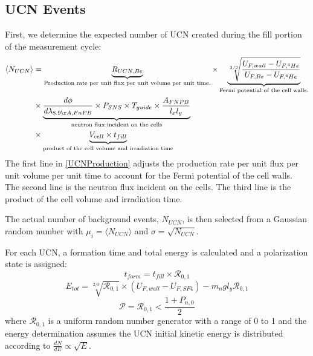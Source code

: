 \subsection{UCN Events}
First, we determine the expected number of UCN created during the fill portion of the measurement cycle:
\begin{align}\label{UCNProduction}
\begin{split}
    \langle N_{UCN} \rangle  & = \underbrace{ R_{UCN, Be} }_{\text{Production rate per unit flux per unit volume per unit time.} } \times  \underbrace{ \sqrt[3/2]{ \frac{ U_{F,wall}  - U_{F,^4He} }{ U_{F,Be} - U_{F,^4He} } } }_{\text{Fermi potential of the cell walls.}}   \\ 
    & \times \underbrace{ \frac{d \phi}{d \lambda_{8.9\AA,FnPB}} \times P_{SNS} \times T_{guide} \times \frac{A_{FNPB}}{ l_x l_y} }_{\text{neutron flux incident on the cells}} \\ 
    & \times \underbrace{ V_{cell} \times t_{fill} }_{\text{product of the cell volume and irradiation time}}
\end{split}
\end{align}
The first line in \autoref{UCNProduction} adjusts the production rate per unit flux per unit volume per unit time to account for the Fermi potential of the cell walls. The second line is the neutron flux incident on the cells. The third line is the product of the cell volume and irradiation time.

The actual number of background events, $N_{UCN}$, is then selected from a Gaussian random number with $\mu_{i} = \langle N_{UCN} \rangle$ and $ \sigma = \sqrt{N_{UCN}} $.

For each UCN, a formation time and total energy is calculated and a polarization state is assigned:
\begin{equation}
    t_{form} = t_{fill} \times \mathcal{R}_{0,1}
\end{equation}
\begin{equation}
    E_{tot} = \sqrt[2/3]{\mathcal{R}_{0,1}} \times \left( U_{F,wall} - U_{F, SF4} \right) - m_{n}gl_{y}\mathcal{R}_{0,1}
\end{equation}
\begin{equation}
    \mathcal{P} = \mathcal{R}_{0,1} < \frac{1+P_{n,0}}{2}
\end{equation}
where $\mathcal{R}_{0,1}$  is a uniform random number generator with a range of 0 to 1 and the energy determination assumes the UCN initial kinetic energy is distributed according to $\frac{dN}{dE} \propto \sqrt{E} $.


